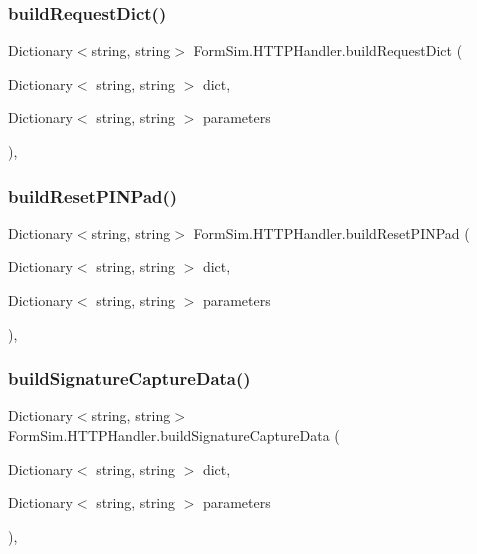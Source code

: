 \subsubsection{\texorpdfstring{build\+Request\+Dict()}{buildRequestDict()}}
{\footnotesize\ttfamily Dictionary$<$string, string$>$ Form\+Sim.\+H\+T\+T\+P\+Handler.\+build\+Request\+Dict (\begin{DoxyParamCaption}\item[{Dictionary$<$ string, string $>$}]{dict,  }\item[{Dictionary$<$ string, string $>$}]{parameters }\end{DoxyParamCaption})\hspace{0.3cm}{\ttfamily [inline]}, {\ttfamily [private]}}

\mbox{\label{class_form_sim_1_1_h_t_t_p_handler_a765f05cd55ea7dfd8b11e208451a80de}} 
\subsubsection{\texorpdfstring{build\+Reset\+P\+I\+N\+Pad()}{buildResetPINPad()}}
{\footnotesize\ttfamily Dictionary$<$string, string$>$ Form\+Sim.\+H\+T\+T\+P\+Handler.\+build\+Reset\+P\+I\+N\+Pad (\begin{DoxyParamCaption}\item[{Dictionary$<$ string, string $>$}]{dict,  }\item[{Dictionary$<$ string, string $>$}]{parameters }\end{DoxyParamCaption})\hspace{0.3cm}{\ttfamily [inline]}, {\ttfamily [private]}}

\mbox{\label{class_form_sim_1_1_h_t_t_p_handler_a8c0df472052df15698ec2693b7a90a39}} 
\subsubsection{\texorpdfstring{build\+Signature\+Capture\+Data()}{buildSignatureCaptureData()}}
{\footnotesize\ttfamily Dictionary$<$string, string$>$ Form\+Sim.\+H\+T\+T\+P\+Handler.\+build\+Signature\+Capture\+Data (\begin{DoxyParamCaption}\item[{Dictionary$<$ string, string $>$}]{dict,  }\item[{Dictionary$<$ string, string $>$}]{parameters }\end{DoxyParamCaption})\hspace{0.3cm}{\ttfamily [inline]}, {\ttfamily [private]}}

